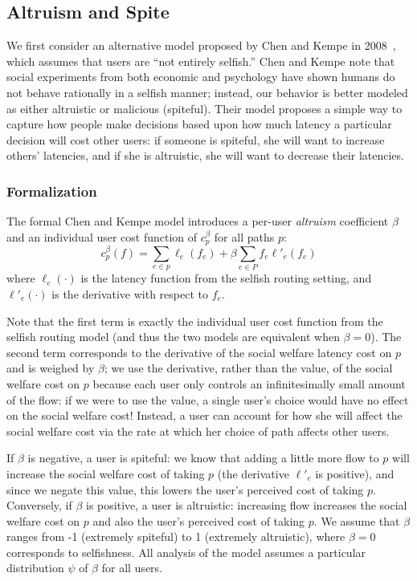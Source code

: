 \subsection{Altruism and Spite}
We first consider an alternative model proposed by Chen and Kempe in 2008~\cite{chen}, which assumes that users are ``not entirely selfish.''
Chen and Kempe note that social experiments from both economic and psychology have shown humans do not behave rationally in a selfish manner; instead, our behavior is better modeled as either altruistic or malicious (spiteful).
Their model proposes a simple way to capture how people make decisions based upon how much latency a particular decision will cost other users: if someone is spiteful, she will want to increase others' latencies, and if she is altruistic, she will want to decrease their latencies.

\subsubsection{Formalization}
The formal Chen and Kempe model introduces a per-user \emph{altruism} coefficient $\beta$ and an individual user cost function
of $c^\beta_p$ for all paths $p$:
$$c^\beta_p(f) = \sum_{e \in p} \ell_e(f_e) + \beta\sum_{e\in P} f_e\ell'_e(f_e)$$
where $\ell_e(\cdot)$ is the latency function from the selfish routing setting, and $\ell'_e(\cdot)$ is the derivative with respect to $f_e$.

Note that the first term is exactly the individual user cost function from the selfish routing model (and thus the two models are equivalent when $\beta = 0$). The second term corresponds to the derivative of the social welfare latency cost on $p$ and is weighed by $\beta$; we use the derivative, rather than the value, of the social welfare cost on $p$ because each user only controls an infinitesimally small amount of the flow: if we were to use the value, a single user's choice would have no effect on the social welfare cost! 
Instead, a user can account for how she will affect the social welfare cost via the rate at which her choice of path affects other users.

If $\beta$ is negative, a user is spiteful: we know that adding a little more flow to $p$ will increase the social welfare cost of taking $p$ (the derivative $\ell'_e$ is positive), and since we negate this value, this lowers the user's perceived cost of taking $p$.
Conversely, if $\beta$ is positive, a user is altruistic: increasing flow increases the social welfare cost on $p$ and also the user's perceived cost of taking $p$.
We assume that $\beta$ ranges from -1 (extremely spiteful) to 1 (extremely altruistic), where $\beta=0$ corresponds to selfishness.
All analysis of the model assumes a particular distribution $\psi$ of $\beta$ for all users. 

